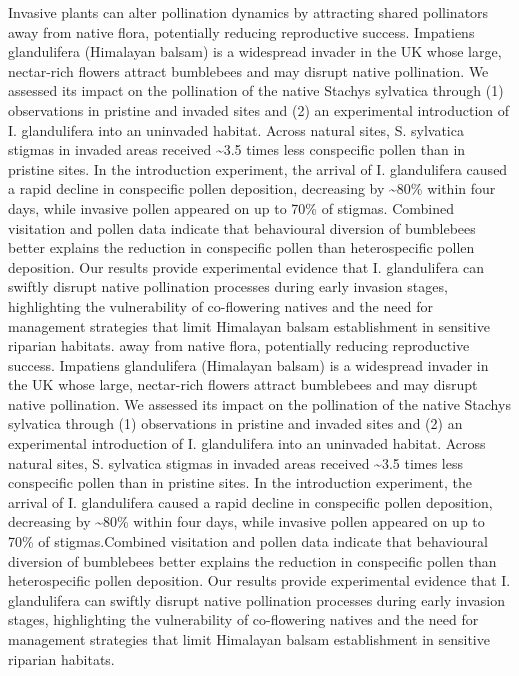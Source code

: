\documentclass[
  letterpaper,
  DIV=11,
  numbers=noendperiod]{scrartcl}
\begin{document}
Invasive plants can alter pollination dynamics by attracting shared
pollinators away from native flora, potentially reducing reproductive
success. Impatiens glandulifera (Himalayan balsam) is a widespread
invader in the UK whose large, nectar-rich flowers attract bumblebees
and may disrupt native pollination. We assessed its impact on the
pollination of the native Stachys sylvatica through (1) observations in
pristine and invaded sites and (2) an experimental introduction of I.
glandulifera into an uninvaded habitat. Across natural sites, S.
sylvatica stigmas in invaded areas received \textasciitilde3.5 times
less conspecific pollen than in pristine sites. In the introduction
experiment, the arrival of I. glandulifera caused a rapid decline in
conspecific pollen deposition, decreasing by \textasciitilde80\% within
four days, while invasive pollen appeared on up to 70\% of stigmas.
Combined visitation and pollen data indicate that behavioural diversion
of bumblebees better explains the reduction in conspecific pollen than
heterospecific pollen deposition. Our results provide experimental
evidence that I. glandulifera can swiftly disrupt native pollination
processes during early invasion stages, highlighting the vulnerability
of co-flowering natives and the need for management strategies that
limit Himalayan balsam establishment in sensitive riparian habitats.
away from native flora, potentially reducing reproductive success.
Impatiens glandulifera (Himalayan balsam) is a widespread invader in the
UK whose large, nectar-rich flowers attract bumblebees and may disrupt
native pollination. We assessed its impact on the pollination of the
native Stachys sylvatica through (1) observations in pristine and
invaded sites and (2) an experimental introduction of I. glandulifera
into an uninvaded habitat. Across natural sites, S. sylvatica stigmas in
invaded areas received \textasciitilde3.5 times less conspecific pollen
than in pristine sites. In the introduction experiment, the arrival of
I. glandulifera caused a rapid decline in conspecific pollen deposition,
decreasing by \textasciitilde80\% within four days, while invasive
pollen appeared on up to 70\% of stigmas.Combined visitation and pollen
data indicate that behavioural diversion of bumblebees better explains
the reduction in conspecific pollen than heterospecific pollen
deposition. Our results provide experimental evidence that I.
glandulifera can swiftly disrupt native pollination processes during
early invasion stages, highlighting the vulnerability of co-flowering
natives and the need for management strategies that limit Himalayan
balsam establishment in sensitive riparian habitats.
\end{document}
